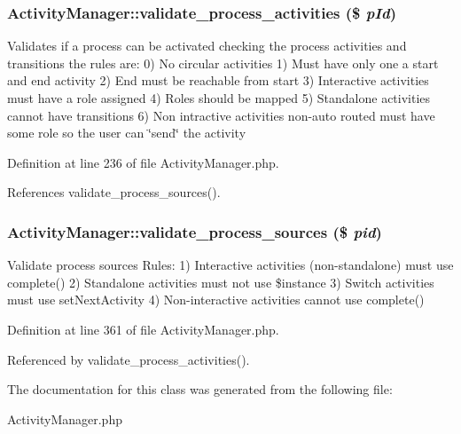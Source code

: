 \subsubsection{\setlength{\rightskip}{0pt plus 5cm}Activity\-Manager::validate\_\-process\_\-activities (\$ {\em p\-Id})}\label{classActivityManager_a13}


Validates if a process can be activated checking the process activities and transitions the rules are: 0) No circular activities 1) Must have only one a start and end activity 2) End must be reachable from start 3) Interactive activities must have a role assigned 4) Roles should be mapped 5) Standalone activities cannot have transitions 6) Non intractive activities non-auto routed must have some role so the user can \char`\"{}send\char`\"{} the activity 

Definition at line 236 of file Activity\-Manager.php.

References validate\_\-process\_\-sources().
\subsubsection{\setlength{\rightskip}{0pt plus 5cm}Activity\-Manager::validate\_\-process\_\-sources (\$ {\em pid})}\label{classActivityManager_a14}


Validate process sources Rules: 1) Interactive activities (non-standalone) must use complete() 2) Standalone activities must not use \$instance 3) Switch activities must use set\-Next\-Activity 4) Non-interactive activities cannot use complete() 

Definition at line 361 of file Activity\-Manager.php.

Referenced by validate\_\-process\_\-activities().

The documentation for this class was generated from the following file:\begin{CompactItemize}
\item 
Activity\-Manager.php\end{CompactItemize}

